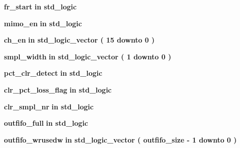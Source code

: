 \begin{DoxyCompactItemize}
\item 
{\bf fr\+\_\+start}  {\bfseries {\bfseries \textcolor{keywordflow}{in}\textcolor{vhdlchar}{ }}} {\bfseries \textcolor{comment}{std\+\_\+logic}\textcolor{vhdlchar}{ }} 
\item 
{\bf mimo\+\_\+en}  {\bfseries {\bfseries \textcolor{keywordflow}{in}\textcolor{vhdlchar}{ }}} {\bfseries \textcolor{comment}{std\+\_\+logic}\textcolor{vhdlchar}{ }} 
\item 
{\bf ch\+\_\+en}  {\bfseries {\bfseries \textcolor{keywordflow}{in}\textcolor{vhdlchar}{ }}} {\bfseries \textcolor{comment}{std\+\_\+logic\+\_\+vector}\textcolor{vhdlchar}{ }\textcolor{vhdlchar}{(}\textcolor{vhdlchar}{ }\textcolor{vhdlchar}{ } \textcolor{vhdldigit}{15} \textcolor{vhdlchar}{ }\textcolor{keywordflow}{downto}\textcolor{vhdlchar}{ }\textcolor{vhdlchar}{ } \textcolor{vhdldigit}{0} \textcolor{vhdlchar}{ }\textcolor{vhdlchar}{)}\textcolor{vhdlchar}{ }} 
\item 
{\bf smpl\+\_\+width}  {\bfseries {\bfseries \textcolor{keywordflow}{in}\textcolor{vhdlchar}{ }}} {\bfseries \textcolor{comment}{std\+\_\+logic\+\_\+vector}\textcolor{vhdlchar}{ }\textcolor{vhdlchar}{(}\textcolor{vhdlchar}{ }\textcolor{vhdlchar}{ } \textcolor{vhdldigit}{1} \textcolor{vhdlchar}{ }\textcolor{keywordflow}{downto}\textcolor{vhdlchar}{ }\textcolor{vhdlchar}{ } \textcolor{vhdldigit}{0} \textcolor{vhdlchar}{ }\textcolor{vhdlchar}{)}\textcolor{vhdlchar}{ }} 
\item 
{\bf pct\+\_\+clr\+\_\+detect}  {\bfseries {\bfseries \textcolor{keywordflow}{in}\textcolor{vhdlchar}{ }}} {\bfseries \textcolor{comment}{std\+\_\+logic}\textcolor{vhdlchar}{ }} 
\item 
{\bf clr\+\_\+pct\+\_\+loss\+\_\+flag}  {\bfseries {\bfseries \textcolor{keywordflow}{in}\textcolor{vhdlchar}{ }}} {\bfseries \textcolor{comment}{std\+\_\+logic}\textcolor{vhdlchar}{ }} 
\item 
{\bf clr\+\_\+smpl\+\_\+nr}  {\bfseries {\bfseries \textcolor{keywordflow}{in}\textcolor{vhdlchar}{ }}} {\bfseries \textcolor{comment}{std\+\_\+logic}\textcolor{vhdlchar}{ }} 
\item 
{\bf outfifo\+\_\+full}  {\bfseries {\bfseries \textcolor{keywordflow}{in}\textcolor{vhdlchar}{ }}} {\bfseries \textcolor{comment}{std\+\_\+logic}\textcolor{vhdlchar}{ }} 
\item 
{\bf outfifo\+\_\+wrusedw}  {\bfseries {\bfseries \textcolor{keywordflow}{in}\textcolor{vhdlchar}{ }}} {\bfseries \textcolor{comment}{std\+\_\+logic\+\_\+vector}\textcolor{vhdlchar}{ }\textcolor{vhdlchar}{(}\textcolor{vhdlchar}{ }\textcolor{vhdlchar}{ }\textcolor{vhdlchar}{ }\textcolor{vhdlchar}{ }{\bfseries {\bf outfifo\+\_\+size}} \textcolor{vhdlchar}{-\/}\textcolor{vhdlchar}{ } \textcolor{vhdldigit}{1} \textcolor{vhdlchar}{ }\textcolor{keywordflow}{downto}\textcolor{vhdlchar}{ }\textcolor{vhdlchar}{ } \textcolor{vhdldigit}{0} \textcolor{vhdlchar}{ }\textcolor{vhdlchar}{)}\textcolor{vhdlchar}{ }} 

\end{DoxyCompactItemize}
